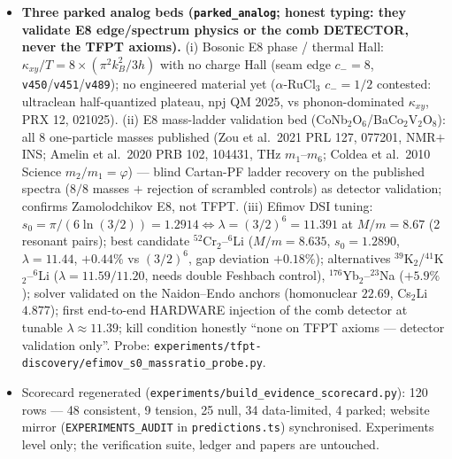 \begin{itemize}[leftmargin=1.5em]
window attenuation $|F(\omega)|=0.033$, $\delta\mu=7.4\times10^{-12}=0.007\sigma$ even at Voyage
2050 --- the theory itself predicts where it is invisible, so NO separate comb-search row is
opened. Shares the \texttt{Nstar\_branch} alternative group with the two $A_s$ rows (one branch
question, several readings). Kill: robust $\mu<0.9\times10^{-8}$ or $>4\times10^{-8}$. Probe:
\texttt{experiments/tfpt-discovery/mu\_distortion\_probe.py}.
\item \textbf{Three parked analog beds (\texttt{parked\_analog}; honest typing: they validate E8
edge/spectrum physics or the comb DETECTOR, never the TFPT axioms).} (i) Bosonic E8 phase /
thermal Hall: $\kappa_{xy}/T=8\times(\pi^2k_B^2/3h)$ with no charge Hall (seam edge $c_-{=}8$,
\texttt{v450}/\texttt{v451}/\texttt{v489}); no engineered material yet ($\alpha$-RuCl$_3$
$c_-{=}1/2$ contested: ultraclean half-quantized plateau, npj QM 2025, vs phonon-dominated
$\kappa_{xy}$, PRX 12, 021025). (ii) E8 mass-ladder validation bed
(CoNb$_2$O$_6$/BaCo$_2$V$_2$O$_8$): all 8 one-particle masses published (Zou et al.\ 2021 PRL 127,
077201, NMR$+$INS; Amelin et al.\ 2020 PRB 102, 104431, THz $m_1$--$m_6$; Coldea et al.\ 2010
Science $m_2/m_1{=}\varphi$) --- blind Cartan-PF ladder recovery on the published spectra ($8/8$
masses $+$ rejection of scrambled controls) as detector validation; confirms Zamolodchikov E8, not
TFPT. (iii) Efimov DSI tuning: $s_0=\pi/(6\ln(3/2))=1.2914\Leftrightarrow\lambda=(3/2)^6=11.391$
at $M/m=8.67$ (2 resonant pairs); best candidate $^{52}$Cr$_2$--$^{6}$Li ($M/m{=}8.635$,
$s_0{=}1.2890$, $\lambda{=}11.44$, $+0.44\%$ vs $(3/2)^6$, gap deviation $+0.18\%$); alternatives
$^{39}$K$_2$/$^{41}$K$_2$--$^{6}$Li ($\lambda=11.59/11.20$, needs double Feshbach control),
$^{176}$Yb$_2$--$^{23}$Na ($+5.9\%$); solver validated on the Naidon--Endo anchors (homonuclear
$22.69$, Cs$_2$Li $4.877$); first end-to-end HARDWARE injection of the comb detector at tunable
$\lambda\approx11.39$; kill condition honestly ``none on TFPT axioms --- detector validation
only''. Probe: \texttt{experiments/tfpt-discovery/efimov\_s0\_massratio\_probe.py}.
\item Scorecard regenerated (\texttt{experiments/build\_evidence\_scorecard.py}): 120 rows --- 48
consistent, 9 tension, 25 null, 34 data-limited, 4 parked; website mirror
(\texttt{EXPERIMENTS\_AUDIT} in \texttt{predictions.ts}) synchronised. Experiments level only; the
verification suite, ledger and papers are untouched.
\end{itemize}

